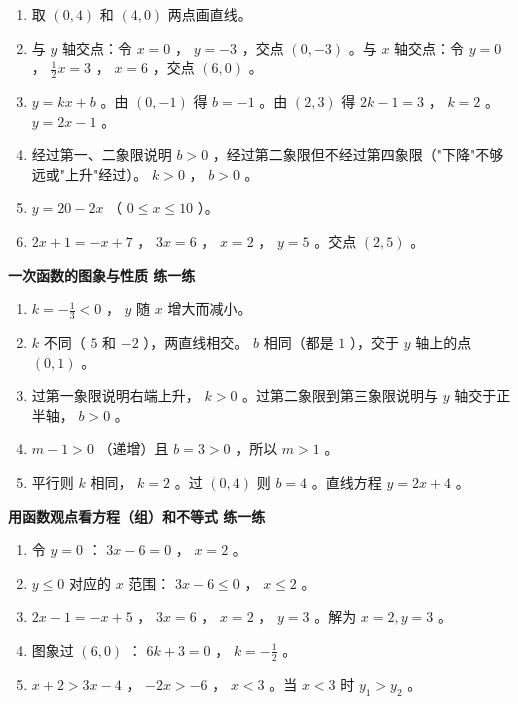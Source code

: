 \begin{answer}
\begin{enumerate}
  \item 取 $(0, 4)$ 和 $(4, 0)$ 两点画直线。
  \item 与 $y$ 轴交点：令 $x = 0$ ， $y = -3$ ，交点 $(0, -3)$ 。与 $x$ 轴交点：令 $y = 0$ ， $\frac{1}{2}x = 3$ ， $x = 6$ ，交点 $(6, 0)$ 。
  \item $y = kx + b$ 。由 $(0, -1)$ 得 $b = -1$ 。由 $(2, 3)$ 得 $2k - 1 = 3$ ， $k = 2$ 。 $y = 2x - 1$ 。
  \item 经过第一、二象限说明 $b > 0$ ，经过第二象限但不经过第四象限（"下降"不够远或"上升"经过）。 $k > 0$ ， $b > 0$ 。
  \item $y = 20 - 2x$ （ $0 \leq x \leq 10$ ）。
  \item $2x + 1 = -x + 7$ ， $3x = 6$ ， $x = 2$ ， $y = 5$ 。交点 $(2, 5)$ 。
\end{enumerate}


\textbf{一次函数的图象与性质 练一练}

\begin{enumerate}
  \item $k = -\frac{1}{3} < 0$ ， $y$ 随 $x$ 增大而减小。
  \item $k$ 不同（ $5$ 和 $-2$ ），两直线相交。 $b$ 相同（都是 $1$ ），交于 $y$ 轴上的点 $(0, 1)$ 。
  \item 过第一象限说明右端上升， $k > 0$ 。过第二象限到第三象限说明与 $y$ 轴交于正半轴， $b > 0$ 。
  \item $m - 1 > 0$ （递增）且 $b = 3 > 0$ ，所以 $m > 1$ 。
  \item 平行则 $k$ 相同， $k = 2$ 。过 $(0, 4)$ 则 $b = 4$ 。直线方程 $y = 2x + 4$ 。
\end{enumerate}


\textbf{用函数观点看方程（组）和不等式 练一练}

\begin{enumerate}
  \item 令 $y = 0$ ： $3x - 6 = 0$ ， $x = 2$ 。
  \item $y \leq 0$ 对应的 $x$ 范围： $3x - 6 \leq 0$ ， $x \leq 2$ 。
  \item $2x - 1 = -x + 5$ ， $3x = 6$ ， $x = 2$ ， $y = 3$ 。解为 $x = 2, y = 3$ 。
  \item 图象过 $(6, 0)$ ： $6k + 3 = 0$ ， $k = -\frac{1}{2}$ 。
  \item $x + 2 > 3x - 4$ ， $-2x > -6$ ， $x < 3$ 。当 $x < 3$ 时 $y_1 > y_2$ 。
\end{enumerate}


\end{answer}
